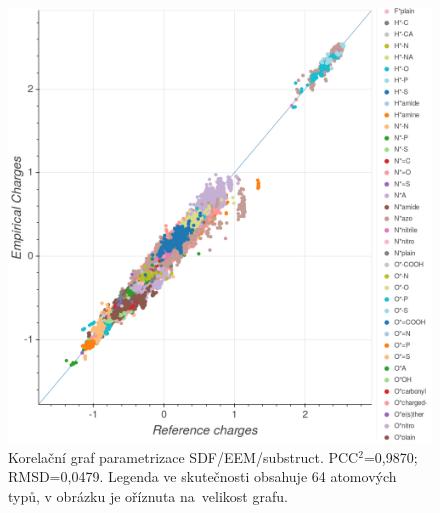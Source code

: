 \begin{figure}[]
\begin{center}
\includegraphics[width=14cm]{pictures/graph_correlation_SDF_EEM_substruct.png}
\caption{Korelační graf parametrizace SDF/EEM/substruct.  PCC$^2$=0,9870; RMSD=0,0479. Legenda ve skutečnosti obsahuje 64 atomových typů, v obrázku je oříznuta na~velikost grafu.}
\label{graph_corr_EEM}
\end{center}
\end{figure}

